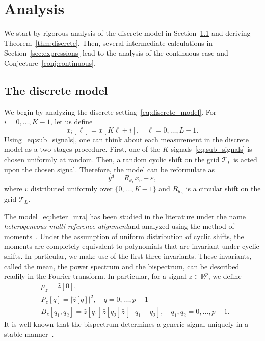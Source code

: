 \documentclass[english,12pt]{article}
\newcommand{\R}{\mathbb{R}}
\newcommand{\T}{\mathcal{T}}
\newcommand{\TODO}[1]{{\color{red}{[#1]}}}
\numberwithin{equation}{section}
\numberwithin{thm}{section} %
\begin{document}
\section{Analysis}

We start by rigorous analysis of the discrete model in Section~\ref{sec:discrete_analysis} and deriving Theorem~\ref{thm:discrete}. Then, several intermediate calculations in Section~\ref{sec:expressions}  lead to the analysis of the continuous case and Conjecture~\ref{conj:continuous}.

\subsection{The discrete model} \label{sec:discrete_analysis}

We begin by analyzing the discrete setting~\eqref{eq:discrete_model}. 
For $i = 0,\ldots,K-1$, let us define 
\begin{equation} \label{eq:sub_signals}
x_i[\ell] = x[K\ell + i], \quad \ell=0,\ldots,L-1.
\end{equation}
Using~\eqref{eq:sub_signals}, one can think about each measurement in the discrete model 
as a two stages procedure. First, one of the $K$ signals~\eqref{eq:sub_signals} is chosen uniformly at random. Then, a random cyclic shift on the grid $\T_L$ is acted upon the chosen signal.
Therefore, the model can be reformulate  as 
\begin{equation} \label{eq:heter_mra}
y^d =  R_{\theta_{L}} x_{v} + \varepsilon,
\end{equation}
where $v$ distributed uniformly over $\{0,\ldots,K-1\}$ and $R_{\theta_L}$ is a circular shift on the grid $\T_L$. 

The model~\eqref{eq:heter_mra} has been studied in the literature under the name \emph{heterogeneous multi-reference alignment}and analyzed using the method of moments~\cite{perry2017sample,bandeira2017estimation,boumal2018heterogeneous}. Under the assumption of uniform distribution of cyclic shifts, the moments are completely equivalent to polynomials that are invariant under cyclic shifts. In particular, we make use of the first three invariants.  These invariants, called the mean, the power spectrum and the bispectrum, can be described readily in the Fourier transform. In particular, for a signal $z\in\R^p$, we define
\begin{align}
&\mu_z = \hat{z}[0], \nonumber \\
&P_z[q] = \vert \hat{z}[q]\vert^2, \quad q=0,\ldots,p-1\\
&B_z[q_1,q_2] = \hat{z}[q_1]\hat{z}[q_2]\hat{z}[-q_1-q_2], \quad q_1,q_2=0,\ldots,p-1. \nonumber
\end{align}  
It is well known that the bispectrum determines a generic signal uniquely in a stable manner~\cite{bendory2017bispectrum}. \TODO{Ref}
\end{document}
